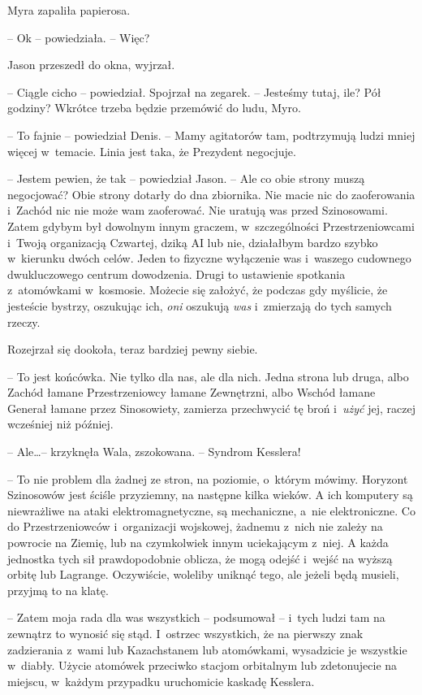 \documentclass[oneside,polish,11pt,sfheadings]{mwbk}
\begin{document}
Myra zapaliła papierosa. 

-- Ok -- powiedziała. -- Więc?

Jason przeszedł do okna, wyjrzał. 

-- Ciągle cicho -- powiedział. Spojrzał
na zegarek. -- Jesteśmy tutaj, ile? Pół godziny? Wkrótce trzeba będzie
przemówić do ludu, Myro.

-- To fajnie -- powiedział Denis. -- Mamy agitatorów tam, podtrzymują ludzi
mniej więcej w~temacie. Linia jest taka, że Prezydent negocjuje.

-- Jestem pewien, że tak -- powiedział Jason. -- Ale co obie strony muszą
negocjować? Obie strony dotarły do dna zbiornika. Nie macie nic do
zaoferowania i~Zachód nic nie może wam zaoferować. Nie uratują was przed
Szinosowami. Zatem gdybym był dowolnym innym graczem, w~szczególności
Przestrzeniowcami i~Twoją organizacją Czwartej, dziką AI lub nie,
działałbym bardzo szybko w~kierunku dwóch celów. Jeden to fizyczne
wyłączenie was i~waszego cudownego dwukluczowego centrum dowodzenia.
Drugi to ustawienie spotkania z~atomówkami w~kosmosie. Możecie się
założyć, że podczas gdy myślicie, że jesteście bystrzy, oszukując ich,
\textit{oni} oszukują \textit{was} i~zmierzają do tych samych rzeczy.

Rozejrzał się dookoła, teraz bardziej pewny siebie. 

-- To jest końcówka.
Nie tylko dla nas, ale dla nich. Jedna strona lub druga, albo Zachód łamane
Przestrzeniowcy łamane Zewnętrzni, albo Wschód łamane Generał łamane
przez Sinosowiety, zamierza przechwycić tę broń i~\textit{użyć} jej,
raczej wcześniej niż później.

-- Ale\ldots -- krzyknęła Wala, zszokowana. -- Syndrom Kesslera!

-- To nie problem dla żadnej ze stron, na poziomie, o~którym mówimy.
Horyzont Szinosowów jest ściśle przyziemny, na następne kilka wieków. A
ich komputery są niewrażliwe na ataki elektromagnetyczne, są
mechaniczne, a~nie elektroniczne. Co do Przestrzeniowców i~organizacji
wojskowej, żadnemu z~nich nie zależy na powrocie na Ziemię, lub na
czymkolwiek innym uciekającym z~niej. A każda jednostka tych sił
prawdopodobnie oblicza, że mogą odejść i~wejść na wyższą orbitę lub
Lagrange. Oczywiście, woleliby uniknąć tego, ale jeżeli będą musieli,
przyjmą to na klatę.

-- Zatem moja rada dla was wszystkich -- podsumował -- i~tych ludzi tam na
zewnątrz to wynosić się stąd. I~ostrzec wszystkich, że na pierwszy znak
zadzierania z~wami lub Kazachstanem lub atomówkami, wysadzicie je
wszystkie w~diabły. Użycie atomówek przeciwko stacjom orbitalnym lub
zdetonujecie na miejscu, w~każdym przypadku uruchomicie kaskadę
Kesslera.
\end{document}
